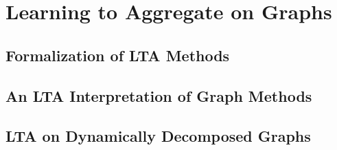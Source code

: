 \chapter{Learning to Aggregate on Graphs}%
\label{sec:ltag}

\section{Formalization of LTA Methods}%
\label{sec:ltag:formal}

\section{An LTA Interpretation of Graph Methods}%
\label{sec:ltag:interpretation}

\section{LTA on Dynamically Decomposed Graphs}%
\label{sec:ltag:dyndecomp}
